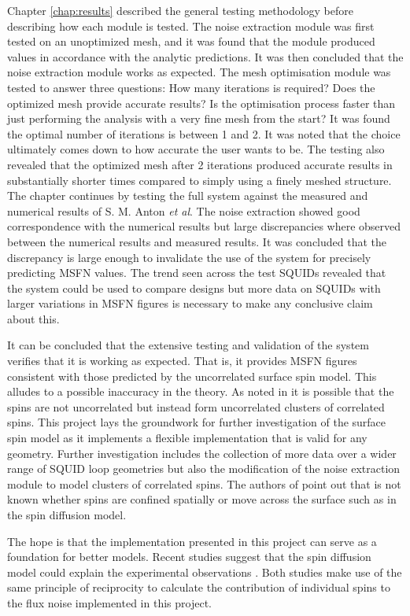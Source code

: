 \par
Chapter \ref{chap:results} described the general testing methodology before describing how each module is tested. The noise extraction module was first tested on an unoptimized mesh, and it was found that the module produced values in accordance with the analytic predictions. It was then concluded that the noise extraction module works as expected. The mesh optimisation module was tested to answer three questions: How many iterations is required? Does the optimized mesh provide accurate results? Is the optimisation process faster than just performing the analysis with a very fine mesh from the start? It was found the optimal number of iterations is between 1 and 2. It was noted that the choice ultimately comes down to how accurate the user wants to be. The testing also revealed that the optimized mesh after 2 iterations produced accurate results in substantially shorter times compared to simply using a finely meshed structure. The chapter continues by testing the full system against the measured and numerical results of S. M. Anton \textit{et al}. The noise extraction showed good correspondence with the numerical results but large discrepancies where observed between the numerical results and measured results. It was concluded that the discrepancy is large enough to invalidate the use of the system for precisely predicting MSFN values. The trend seen across the test SQUIDs revealed that the system could be used to compare designs but more data on SQUIDs with larger variations in MSFN figures is necessary to make any conclusive claim about this.
\par
It can be concluded that the extensive testing and validation of the system verifies that it is working as expected. That is, it provides MSFN figures consistent with those predicted by the uncorrelated surface spin model. This alludes to a possible inaccuracy in the theory. As noted in \cite{fluxNoiseSquidsStevenAnton} it is possible that the spins are not uncorrelated but instead form uncorrelated clusters of correlated spins. This project lays the groundwork for further investigation of the surface spin model as it implements a flexible implementation that is valid for any geometry. Further investigation includes the collection of more data over a wider range of SQUID loop geometries but also the modification of the noise extraction module to model clusters of correlated spins. The authors of \cite{fluxNoiseSquidsStevenAnton} point out that is not known whether spins are confined spatially or move across the surface such as in the spin diffusion model. \par 
The hope is that the implementation presented in this project can serve as a foundation for better models. Recent studies suggest that the spin diffusion model could explain the experimental observations \cite{FNdisord,FNtempdepend}. Both studies make use of the same principle of reciprocity to calculate the contribution of individual spins to the flux noise implemented in this project. 